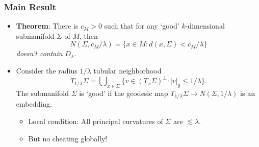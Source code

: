 \documentclass[usenames,dvipsnames,12pt]{beamer}
\begin{document}
\begin{frame}

        


\end{frame}

\begin{frame}
    \frametitle{Main Result}

    \begin{itemize}
        \item {\bf Theorem}: There is $c_M > 0$ such that for any `good' $k$-dimensional submanifold $\Sigma$ of $M$, then
        \[ N(\Sigma, c_M / \lambda) = \{ x \in M : d(x,\Sigma) < c_M / \lambda \} \]
        \emph{doesn't contain} $D_\lambda$.

        \pause
        \item Consider the radius $1/\lambda$ tubular neighborhood
        \[ T_{1/\lambda} \Sigma = \bigcup\nolimits_{x \in \Sigma} \{ v \in (T_x \Sigma)^\perp: |v|_g \leq 1/\lambda \}. \]
        The submanifold $\Sigma$ is `good' if the geodesic map $T_{1/\lambda} \Sigma \to N(\Sigma, 1/\lambda)$ is an embedding.

        \pause
        \begin{itemize}
            \item Local condition: All principal curvatures of $\Sigma$ are $\lesssim \lambda$.

            \pause
            \item But no cheating globally!
        \end{itemize}
    \end{itemize}
\end{frame}
\end{document}
